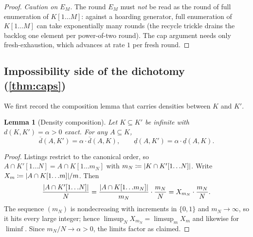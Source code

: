 \documentclass[11pt]{article}
\numberwithin{equation}{section}
\newcommand{\defeq}{\coloneqq}
\DeclarePairedDelimiter{\abs}{\lvert}{\rvert}
\newcommand{\dlow}[2]{\underline{d}(#1,#2)}
\newcommand{\dup}[2]{\overline{d}(#1,#2)}
\newcommand{\dens}[2]{d(#1,#2)}
\newcommand{\rest}[2]{#1[1\!\dots\! #2]}
\theoremstyle{plain}
\newtheorem{lemma}[theorem]{Lemma}
\theoremstyle{definition}
\theoremstyle{remark}
\begin{document}
\begin{proof}
\emph{Caution on $E_M$.} The round $E_M$ must \emph{not} be read as the round of full
enumeration of $\rest{K}{M}$: against a hoarding generator, full enumeration of $\rest{K}{M}$
can take exponentially many rounds (the recycle trickle drains the backlog one element per
power-of-two round). The cap argument needs only fresh-exhaustion, which advances at rate $1$
per fresh round.
\end{proof}

\subsection{Impossibility side of the dichotomy (\texorpdfstring{\cref{thm:caps}}{Theorem 4})}
\label{app:caps}

\begin{statementbox}
\ThmCaps*
\end{statementbox}
We first record the composition lemma that carries densities between $K$ and $K'$.

\begin{lemma}[Density composition]\label{lem:composition}
Let $K \subseteq K'$ be infinite with $\dens{K}{K'} = \alpha > 0$ exact. For any $A \subseteq
K$,
\begin{equation*}
  \dup{A}{K'} = \alpha \cdot \dup{A}{K},
  \qquad
  \dlow{A}{K'} = \alpha \cdot \dlow{A}{K}.
\end{equation*}
\end{lemma}

\begin{proof}
Listings restrict to the canonical order, so $A \cap \rest{K'}{N} = A \cap \rest{K}{m_N}$ with
$m_N \defeq \abs{K \cap \rest{K'}{N}}$. Write $X_m \defeq \abs{A \cap \rest{K}{m}}/m$. Then
\begin{equation*}
  \frac{\abs{A \cap \rest{K'}{N}}}{N}
  = \frac{\abs{A \cap \rest{K}{m_N}}}{m_N} \cdot \frac{m_N}{N}
  = X_{m_N} \cdot \frac{m_N}{N}.
\end{equation*}
The sequence $(m_N)$ is nondecreasing with increments in $\{0,1\}$ and $m_N \to \infty$, so it
hits every large integer; hence $\limsup_N X_{m_N} = \limsup_m X_m$ and likewise for
$\liminf$. Since $m_N/N \to \alpha > 0$, the limits factor as claimed.
\end{proof}
\end{document}
